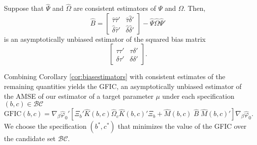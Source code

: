 \begin{cor}
\label{cor:biasestimators}
Suppose that $\widehat{\Psi}$ and $\widehat{\Omega}$ are consistent estimators of $\Psi$ and $\Omega$. Then,
	\begin{equation}\widehat{B} = \left[\begin{array}{cc}  \widehat{\tau} \widehat{\tau}'& \widehat{\tau} \widehat{\delta}'\\ \widehat{\delta} \widehat{\tau}'& \widehat{\delta} \widehat{\delta}'\end{array}\right] - \widehat{\Psi} \widehat{\Omega} \widehat{\Psi}'\end{equation}
is an asymptotically unbiased estimator of the squared bias matrix
$$\left[\begin{array}{cc}  \tau \tau'& \tau \delta'\\ \delta \tau'& \delta \delta'\end{array}\right].$$
\end{cor}
Combining Corollary \ref{cor:biasestimators} with consistent estimates of the remaining quantities yields the GFIC, an asymptotically unbiased estimator of the AMSE of our estimator of a target parameter $\mu$ under each specification $(b,c)\in \mathcal{BC}$
\begin{equation}
\mbox{GFIC}(b,c) =\nabla_\beta \widehat{\varphi}_0' \left[\Xi_b' \widehat{K}(b,c)\widehat{\Omega}_c \widehat{K}(b,c)'\Xi_b +  \widehat{M}(b,c) \;\widehat{B} \; \widehat{M}(b,c)'\right]\nabla_\beta \widehat{\varphi}_0.
\end{equation}
We choose the specification $(b^*,c^*)$ that minimizes the value of the GFIC over the candidate set $\mathcal{BC}$. 


